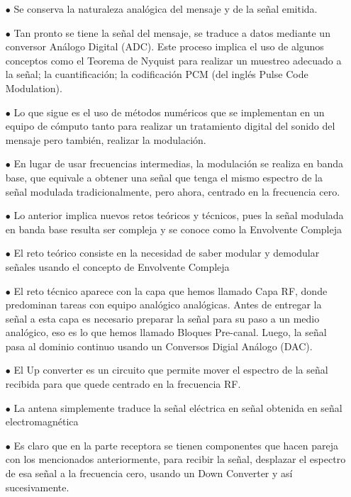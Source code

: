 \begin{itemize}
	\item [$\bullet$] Se conserva la naturaleza analógica del mensaje y de la señal emitida.
    \item [$\bullet$] Tan pronto se tiene la señal del mensaje, se traduce a datos mediante un conversor Análogo Digital (ADC). Este proceso implica el uso de algunos conceptos como el Teorema de Nyquist para realizar un muestreo adecuado a la señal; la cuantificación; la codificación PCM (del inglés Pulse Code Modulation).
    \item [$\bullet$] Lo que sigue es el uso de métodos numéricos que se implementan en un equipo de cómputo tanto para realizar un tratamiento digital del sonido del mensaje pero también, realizar la modulación. 
    \item [$\bullet$] En lugar de usar frecuencias intermedias, la modulación se realiza en banda base, que equivale a obtener una señal que tenga el mismo espectro de la señal modulada tradicionalmente, pero ahora, centrado en la frecuencia cero. 
    \item [$\bullet$] Lo anterior implica nuevos retos teóricos y técnicos, pues la señal modulada en banda base resulta ser compleja y se conoce como la Envolvente Compleja
    \item [$\bullet$] El reto teórico consiste en la necesidad de saber modular y demodular señales usando el concepto de Envolvente Compleja
    \item [$\bullet$] El reto técnico aparece con la capa que hemos llamado Capa RF, donde predominan tareas con equipo analógico analógicas. Antes de entregar la señal a esta capa es necesario preparar la señal para su paso a un medio analógico, eso es lo que hemos llamado Bloques Pre-canal. Luego, la señal pasa al dominio continuo usando un Conversos Digial Análogo (DAC).
    \item [$\bullet$] El Up converter es un circuito que permite mover el espectro de la señal recibida para que quede centrado en la frecuencia RF.
    \item [$\bullet$] La antena simplemente traduce la señal eléctrica en señal obtenida en señal electromagnética
    \item [$\bullet$] Es claro que en la parte receptora se tienen componentes que hacen pareja con los mencionados anteriormente, para recibir la señal, desplazar el espectro de esa señal a la frecuencia cero, usando un Down Converter y así sucesivamente.\\


\end{itemize}
